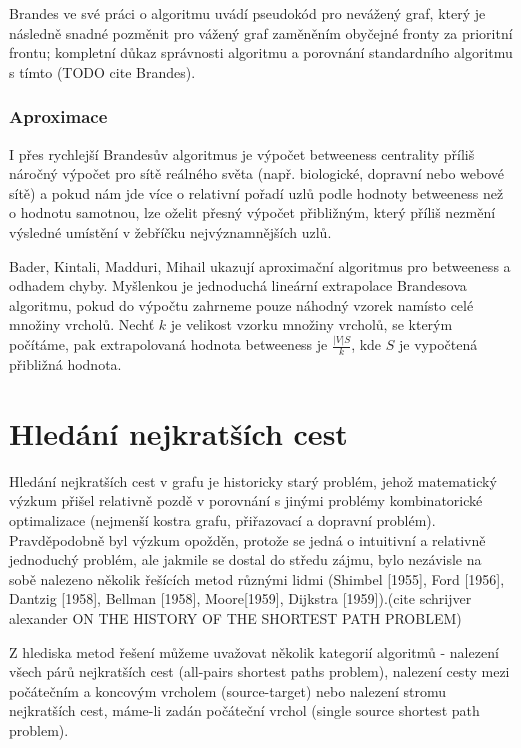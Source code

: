 \documentclass[12pt,titlepage]{report}
\begin{document}

Brandes ve
své práci o algoritmu uvádí pseudokód pro nevážený graf, který je následně
snadné pozměnit pro vážený graf zaměněním obyčejné fronty za prioritní frontu;
kompletní důkaz správnosti algoritmu a porovnání standardního algoritmu s tímto
(TODO cite Brandes).

\subsubsection{Aproximace}
I přes rychlejší Brandesův algoritmus je výpočet betweeness centrality příliš
náročný výpočet pro sítě reálného světa (např. biologické, dopravní nebo webové
sítě) a pokud nám jde více o relativní pořadí uzlů podle hodnoty betweeness než
o hodnotu samotnou, lze oželit přesný výpočet přibližným, který příliš nezmění
výsledné umístění v žebříčku nejvýznamnějších uzlů.

Bader, Kintali, Madduri, Mihail ukazují aproximační algoritmus pro betweeness a
odhadem chyby.  Myšlenkou je jednoduchá lineární extrapolace Brandesova
algoritmu, pokud do výpočtu zahrneme pouze náhodný vzorek namísto celé množiny
vrcholů. Nechť $k$ je velikost vzorku množiny vrcholů, se kterým počítáme, pak
extrapolovaná hodnota betweeness je $\frac{|V| S}{k}$, kde $S$ je vypočtená
přibližná hodnota.


\section{Hledání nejkratších cest}
Hledání nejkratších cest v grafu je historicky starý problém, jehož matematický
výzkum přišel relativně pozdě v porovnání s jinými problémy kombinatorické
optimalizace (nejmenší kostra grafu, přiřazovací a dopravní problém).
Pravděpodobně byl výzkum opožděn, protože se jedná o intuitivní a relativně
jednoduchý problém, ale jakmile se dostal do středu zájmu, bylo nezávisle na
sobě nalezeno několik řešících metod různými lidmi (Shimbel [1955], Ford
[1956], Dantzig [1958], Bellman [1958], Moore[1959], Dijkstra [1959]).(cite
schrijver alexander ON THE HISTORY OF THE SHORTEST PATH PROBLEM)

Z hlediska metod řešení můžeme uvažovat několik kategorií algoritmů - nalezení
všech párů nejkratších cest (all-pairs shortest paths problem), nalezení cesty
mezi počátečním a koncovým vrcholem (source-target) nebo nalezení stromu
nejkratších cest, máme-li zadán počáteční vrchol (single source shortest path
problem).
\end{document}
